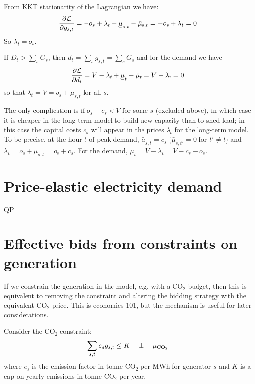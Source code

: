 \documentclass[final,3p]{elsarticle}
\def\l{\lambda} \def\K{\kappa} \def\m{\mu} \def\G{\Gamma} \def\d{\partial}
\def\cL{\mathcal{L}} \newcommand{\ubar}[1]{\text{\b{$#1$}}}
\begin{document}
From KKT stationarity of the Lagrangian we have:
\begin{align}
  \frac{\d \cL}{\d g_{s,t}} =  -o_s + \l_t + \ubar{\mu}_{s,t} - \bar{\mu}_{s,t}  =  -o_s + \l_t = 0
\end{align}
So $\l_t = o_s$.

If $D_t > \sum_s G_{s}$, then $d_t = \sum_s g_{s,t} = \sum_s G_{s}$ and for the
demand we have
\begin{align}
  \frac{\d \cL}{\d d_{t}} =  V -\l_t + \ubar{\mu}_{t} - \bar{\mu}_{t}  =  V - \l_t = 0
\end{align}
so that $\l_t = V = o_s + \bar{\mu}_{s,t}$ for all $s$.

The only complication is if $o_s + c_s < V$ for some $s$ (excluded above), in
which case it is cheaper in the long-term model to build new capacity than to
shed load; in this case the capital costs $c_s$ will appear in the prices $\l_t$
for the long-term model. To be precise, at the hour $t$ of peak demand,
$\bar{\mu}_{s,t} = c_s$ ($\bar{\mu}_{s,t'} =0$ for $t' \neq t$) and $\l_t = o_s
+ \bar{\mu}_{s,t} = o_s + c_s$. For the demand, $\bar{\mu}_{t} = V - \l_t = V -
c_s - o_s$.


\section{Price-elastic electricity demand}

QP


\section{Effective bids from constraints on generation}\label{sec:effective}


If we constrain the generation in the model, e.g. with a CO$_2$ budget, then
this is equivalent to removing the constraint and altering the bidding strategy
with the equivalent CO$_2$ price. This is economics 101, but the mechanism is
useful for later considerations.

Consider the CO$_2$ constraint:
\begin{equation}
  \sum_{s,t} e_s g_{s,t} \leq K \hspace{0.34cm}\perp \hspace{0.34cm} \mu_{\textrm{CO}_2} \label{eq:co2}
\end{equation}
where $e_s$ is the emission factor in tonne-CO$_2$ per MWh\el{} for generator
$s$ and $K$ is a cap on yearly emissions in tonne-CO$_2$ per year.
\end{document}
